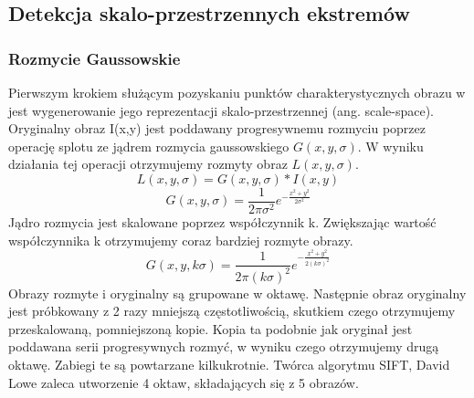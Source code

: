 \subsection{Detekcja skalo-przestrzennych ekstremów}
\subsubsection{Rozmycie Gaussowskie}
Pierwszym krokiem służącym pozyskaniu punktów charakterystycznych obrazu w jest wygenerowanie jego reprezentacji skalo-przestrzennej (ang. scale-space).  Oryginalny obraz I(x,y) jest poddawany progresywnemu rozmyciu poprzez operację splotu ze jądrem rozmycia gaussowskiego $G(x,y,\sigma)$. W wyniku działania tej operacji otrzymujemy rozmyty obraz $L(x,y,\sigma)$. 
\begin{equation}
L(x,y,\sigma) = G(x,y,\sigma) * I(x,y)
\end{equation}
\begin{equation}
G(x,y,\sigma) = \frac{1}{2\pi\sigma^2}e^{-\frac{x^2+y^2}{2\sigma^2}}
\end{equation}
Jądro rozmycia jest skalowane poprzez współczynnik k. Zwiększając wartość współczynnika k otrzymujemy coraz bardziej rozmyte obrazy. 
\begin{equation}
G(x,y,k\sigma) = \frac{1}{2\pi(k\sigma)^2}e^{-\frac{x^2+y^2}{2(k\sigma)^2}}
\end{equation}
Obrazy rozmyte i oryginalny są grupowane w oktawę. Następnie obraz oryginalny jest próbkowany z 2 razy mniejszą częstotliwością, skutkiem czego  otrzymujemy przeskalowaną, pomniejszoną kopie. Kopia ta podobnie jak oryginał jest poddawana serii progresywnych rozmyć, w wyniku czego otrzymujemy drugą oktawę. Zabiegi te są powtarzane kilkukrotnie. Twórca algorytmu SIFT, David Lowe zaleca utworzenie 4 oktaw, składających się z 5 obrazów.
